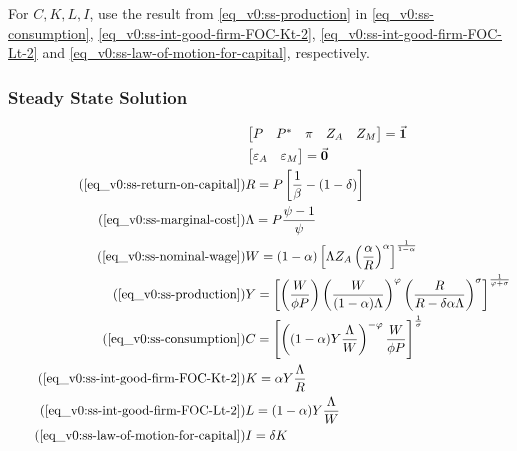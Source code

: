 \documentclass[../thesis.tex]{subfiles}
\begin{document}
	For $C,K,L,I$, use the result from \ref{eq_v0:ss-production} in \ref{eq_v0:ss-consumption}, \ref{eq_v0:ss-int-good-firm-FOC-Kt-2}, \ref{eq_v0:ss-int-good-firm-FOC-Lt-2} and \ref{eq_v0:ss-law-of-motion-for-capital}, respectively.
	
	
	\subsubsection{Steady State Solution}
	
	\vspace*{-1cm}
	
	\begin{align}
		\label{eq_v0:unity-vector}
		& \begin{bmatrix}
			P & P^\ast & \pi & Z_A & Z_M
		\end{bmatrix} = \vec{\bm{1}} \\
		\label{eq_v0:null-vector}
		& \begin{bmatrix}
			\varepsilon_A & \varepsilon_{M}
		\end{bmatrix} = \vec{\bm{0}}\\
		\tag{\ref{eq_v0:ss-return-on-capital}}
		& R = P\left[ \frac{1}{\beta} - (1-\delta) \right] \\
		\tag{\ref{eq_v0:ss-marginal-cost}}
		& \Lambda = P \frac{\psi-1}{\psi} \\
		\tag{\ref{eq_v0:ss-nominal-wage}}
		& W = (1-\alpha) \left[ \Lambda Z_{A} \left( \frac{\alpha}{R} \right)^{\alpha} \right]^\frac{1}{1-\alpha} \\
		\tag{\ref{eq_v0:ss-production}}
		& Y =\left[
		\left( \frac{W}{\phi P}                \right)
		\left( \frac{W}{(1-\alpha)\Lambda}     \right)^\varphi
		\left( \frac{R}{R-\delta\alpha\Lambda} \right)^\sigma
		\right]^\frac{1}{\varphi+\sigma} \\
		\tag{\ref{eq_v0:ss-consumption}}
		& C = \left[ \left( (1-\alpha) Y \frac{\Lambda}{W} \right)^{-\varphi} \frac{W}{\phi P} \right]^{\frac{1}{\sigma}} \\
		\tag{\ref{eq_v0:ss-int-good-firm-FOC-Kt-2}}
		& K = \alpha Y \frac{\Lambda}{R} \\
		\tag{\ref{eq_v0:ss-int-good-firm-FOC-Lt-2}}
		& L = (1-\alpha) Y \frac{\Lambda}{W} \\
		\tag{\ref{eq_v0:ss-law-of-motion-for-capital}}
		& I = \delta K
	\end{align}
	
\end{document}
